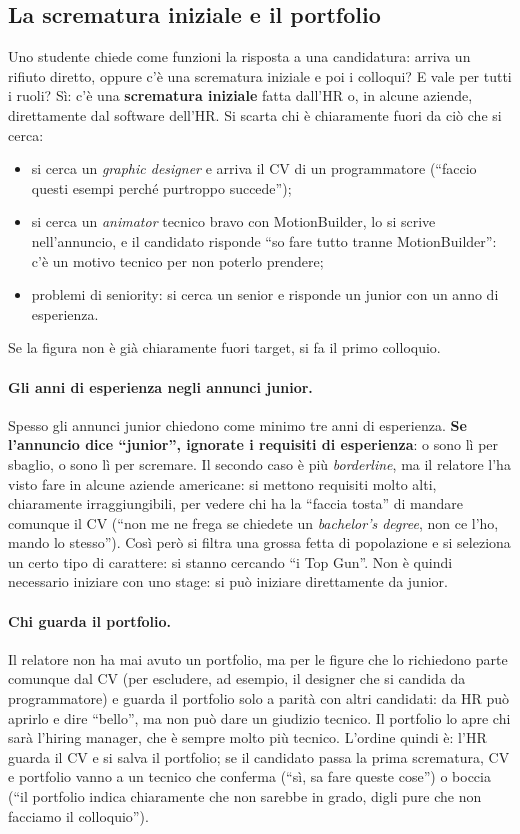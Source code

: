 \subsection{La scrematura iniziale e il portfolio}

Uno studente chiede come funzioni la risposta a una candidatura: arriva un
rifiuto diretto, oppure c'è una scrematura iniziale e poi i colloqui? E vale
per tutti i ruoli? Sì: c'è una \textbf{scrematura iniziale} fatta dall'HR o, in
alcune aziende, direttamente dal software dell'HR. Si scarta chi è chiaramente
fuori da ciò che si cerca:
\begin{itemize}
  \item si cerca un \emph{graphic designer} e arriva il CV di un programmatore
        (``faccio questi esempi perché purtroppo succede'');
  \item si cerca un \emph{animator} tecnico bravo con MotionBuilder, lo si
        scrive nell'annuncio, e il candidato risponde ``so fare tutto tranne
        MotionBuilder'': c'è un motivo tecnico per non poterlo prendere;
  \item problemi di seniority: si cerca un senior e risponde un junior con un
        anno di esperienza.
\end{itemize}
Se la figura non è già chiaramente fuori target, si fa il primo colloquio.

\paragraph{Gli anni di esperienza negli annunci junior.} Spesso gli annunci
junior chiedono come minimo tre anni di esperienza. \textbf{Se l'annuncio dice
``junior'', ignorate i requisiti di esperienza}: o sono lì per sbaglio, o sono lì
per scremare. Il secondo caso è più \emph{borderline}, ma il relatore l'ha
visto fare in alcune aziende americane: si mettono requisiti molto alti,
chiaramente irraggiungibili, per vedere chi ha la ``faccia tosta'' di mandare
comunque il CV (``non me ne frega se chiedete un \emph{bachelor's degree}, non ce
l'ho, mando lo stesso''). Così però si filtra una grossa fetta di popolazione e
si seleziona un certo tipo di carattere: si stanno cercando ``i Top Gun''. Non è
quindi necessario iniziare con uno stage: si può iniziare direttamente da
junior.

\paragraph{Chi guarda il portfolio.} Il relatore non ha mai avuto un portfolio,
ma per le figure che lo richiedono parte comunque dal CV (per escludere, ad
esempio, il designer che si candida da programmatore) e guarda il portfolio
solo a parità con altri candidati: da HR può aprirlo e dire ``bello'', ma non
può dare un giudizio tecnico. Il portfolio lo apre chi sarà l'hiring manager,
che è sempre molto più tecnico. L'ordine quindi è: l'HR guarda il CV e si salva
il portfolio; se il candidato passa la prima scrematura, CV e portfolio vanno
a un tecnico che conferma (``sì, sa fare queste cose'') o boccia (``il
portfolio indica chiaramente che non sarebbe in grado, digli pure che non
facciamo il colloquio'').

